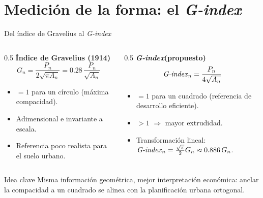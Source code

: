 \documentclass[11pt,aspectratio=169]{beamer}
\newcommand{\Gindex}{\textit{G-index}\xspace}
\begin{document}
\section{Medición de la forma: el \texorpdfstring{\Gindex}{G-index}}
\begin{frame}{Del índice de Gravelius al \Gindex}
  \begin{columns}[T]
    \begin{column}{0.5\textwidth}
      \textbf{Índice de Gravelius (1914)}
      \[ G_n=\frac{P_n}{2\sqrt{\pi A_n}}=0.28\,\frac{P_n}{\sqrt{A_n}} \]
      \begin{itemize}\footnotesize
        \item $=1$ para un círculo (máxima compacidad).
        \item Adimensional e invariante a escala.
        \item Referencia poco realista para el suelo urbano.
      \end{itemize}
    \end{column}
    \begin{column}{0.5\textwidth}
      \textbf{\Gindex (propuesto)}
      \[ \text{\Gindex}_n=\frac{P_n}{4\sqrt{A_n}} \]
      \begin{itemize}\footnotesize
        \item $=1$ para un \alert{cuadrado} (referencia de desarrollo eficiente).
        \item $>1$ $\Rightarrow$ mayor extrudidad.
        \item Transformación lineal: $\text{\Gindex}_n=\tfrac{\sqrt\pi}{2}G_n\approx 0.886\,G_n$.
      \end{itemize}
    \end{column}
  \end{columns}
  \vspace{0.6em}
  \begin{block}{Idea clave}
    Misma información geométrica, \alert{mejor interpretación económica}: anclar la compacidad a un cuadrado se alinea con la planificación urbana ortogonal.
  \end{block}
\end{frame}
\end{document}
